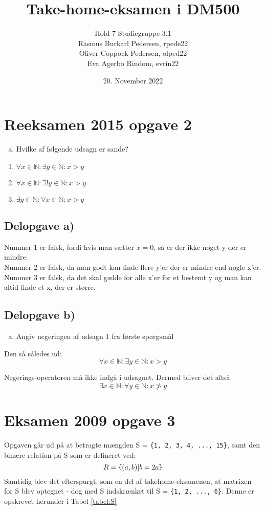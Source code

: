 \documentclass{article}
\title{Take-home-eksamen i DM500}
\author{Hold 7 Studiegruppe 3.1 \\ Rasmus Burkarl Pedersen, rpede22 \\ Oliver Coppock Pedersen, olped22 \\ Eva Agerbo Rindom, evrin22}
\date{20. November 2022}
\begin{document}
\maketitle

\section{Reeksamen 2015 opgave 2}
\begin{enumerate}[a)]
    \item {Hvilke af følgende udsagn er sande?}
\end{enumerate}

\begin{enumerate} \centering
    \item $ \forall x \in \mathbb{N} : \exists y \in \mathbb{N} : x>y$
    \item $ \forall x \in \mathbb{N} : \exists ! y \in \mathbb{N} : x>y$
    \item $ \exists y \in \mathbb{N} : \forall x \in \mathbb{N} : x>y$
\end{enumerate}
    
\subsection{Delopgave a)}
Nummer 1 er falsk, fordi hvis man sætter $x=0$, så er der ikke noget y der er mindre.
\\
Nummer 2 er falsk, da man godt kan finde flere y'er der er mindre end nogle x'er.
\\
Nummer 3 er falsk, da det skal gælde for alle x'er for et bestemt y og man kan altid finde et x, der er større.

\subsection{Delopgave b)}
\begin{enumerate}[b)]
    \item Angiv negeringen af udsagn 1 fra første spørgsmål
\end{enumerate}
Den så således ud:
\[ \forall x \in \mathbb{N} : \exists y \in \mathbb{N} : x>y\]

Negerings-operatoren må ikke indgå i udsagnet.
Dermed bliver det altså
\[ \exists x \in \mathbb{N} : \forall y \in \mathbb{N} : x \not> y\]

\section{Eksamen 2009 opgave 3}
Opgaven går ud på at betragte mængden S = \verb|{1, 2, 3, 4, ..., 15}|, samt den binære relation på S som er defineret ved:
\begin{equation}
    R = \verb|{|(a, b) | b = 2a\verb|}|
\end{equation}
Samtidig blev det efterspurgt, som en del af takehome-eksamenen, at matrixen for S blev optegnet - dog med S indskrænket til S = \verb|{1, 2, ..., 6}|. Denne er opskrevet herunder i Tabel \ref{tabel:S}
\end{document}
